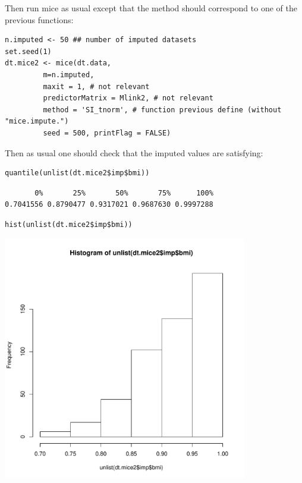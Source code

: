 \documentclass[12pt]{article}
\begin{document}
\clearpage 

Then run mice as usual except that the method should correspond to one of the previous functions:
\lstset{language=r,label= ,caption= ,captionpos=b,numbers=none}
\begin{lstlisting}
n.imputed <- 50 ## number of imputed datasets
set.seed(1)
dt.mice2 <- mice(dt.data,
		 m=n.imputed, 
		 maxit = 1, # not relevant
		 predictorMatrix = Mlink2, # not relevant
		 method = 'SI_tnorm', # function previous define (without "mice.impute.")
		 seed = 500, printFlag = FALSE)
\end{lstlisting}

Then as usual one should check that the imputed values are satisfying:
\lstset{language=r,label= ,caption= ,captionpos=b,numbers=none}
\begin{lstlisting}
quantile(unlist(dt.mice2$imp$bmi))
\end{lstlisting}

\begin{verbatim}
       0%       25%       50%       75%      100% 
0.7041556 0.8790477 0.9317021 0.9687630 0.9997288
\end{verbatim}



\lstset{language=r,label= ,caption= ,captionpos=b,numbers=none}
\begin{lstlisting}
hist(unlist(dt.mice2$imp$bmi))
\end{lstlisting}

\begin{center}
\includegraphics[width=0.8\textwidth]{./figures/histImputed2.pdf}
\end{center}
\end{document}
